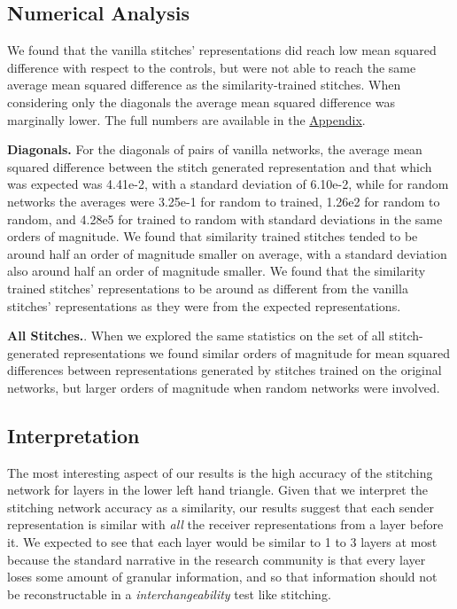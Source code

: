 \documentclass{article} %
\begin{document}
\subsection*{Numerical Analysis}
We found that the vanilla stitches' representations did reach low mean squared difference with respect to the controls,
but were not able to reach the same average mean squared difference as the similarity-trained stitches. When considering
only the diagonals the average mean squared difference was marginally lower. The full numbers are available in the
\hyperref[Appendix]{Appendix}.

\textbf{Diagonals.} For the diagonals of pairs of vanilla networks, the average mean squared difference between
the stitch generated representation and that which was expected was 4.41e-2, with a standard deviation of
6.10e-2, while for random networks the averages were 3.25e-1 for random to trained, 1.26e2 for random to random, and
4.28e5 for trained to random with standard deviations in the same orders of magnitude. We found that similarity
trained stitches tended to be around half an order of magnitude smaller on average, with a standard deviation also
around half an order of magnitude smaller. We found that the similarity trained stitches' representations to be
around as different from the vanilla stitches' representations as they were from the expected representations.

\textbf{All Stitches.}. When we explored the same statistics on the set of all stitch-generated representations we found
similar orders of magnitude for mean squared differences between representations generated by stitches trained on
the original networks, but larger orders of magnitude when random networks were involved.

\subsection*{Interpretation}
The most interesting aspect of our results is the high accuracy of the stitching network
for layers in the lower left hand triangle. Given that we interpret the stitching network accuracy
as a similarity, our results suggest that each sender representation is similar with \textit{all}
the receiver representations from a layer before it. We expected to see that each layer would be
similar to 1 to 3 layers at most because the standard narrative in the research community is that 
every layer loses some amount of granular information, and so that information should not be reconstructable
in a \textit{interchangeability} test like stitching.
\end{document}

